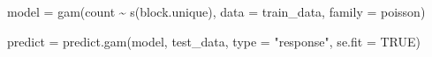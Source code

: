 \documentclass[
  letterpaper,
  DIV=11,
  numbers=noendperiod]{scrartcl}
\newenvironment{Shaded}{\begin{snugshade}}{\end{snugshade}}
\newcommand{\AttributeTok}[1]{\textcolor[rgb]{0.40,0.45,0.13}{#1}}
\newcommand{\ConstantTok}[1]{\textcolor[rgb]{0.56,0.35,0.01}{#1}}
\newcommand{\FunctionTok}[1]{\textcolor[rgb]{0.28,0.35,0.67}{#1}}
\newcommand{\NormalTok}[1]{\textcolor[rgb]{0.00,0.23,0.31}{#1}}
\newcommand{\OtherTok}[1]{\textcolor[rgb]{0.00,0.23,0.31}{#1}}
\newcommand{\SpecialCharTok}[1]{\textcolor[rgb]{0.37,0.37,0.37}{#1}}
\newcommand{\StringTok}[1]{\textcolor[rgb]{0.13,0.47,0.30}{#1}}
\begin{document}
\begin{Shaded}
\begin{Highlighting}[]
\NormalTok{model }\OtherTok{=} \FunctionTok{gam}\NormalTok{(count }\SpecialCharTok{\textasciitilde{}} \FunctionTok{s}\NormalTok{(block.unique), }\AttributeTok{data =}\NormalTok{ train\_data, }\AttributeTok{family =}\NormalTok{ poisson)}
\end{Highlighting}
\end{Shaded}

\begin{Shaded}
\begin{Highlighting}[]
\NormalTok{predict }\OtherTok{=} \FunctionTok{predict.gam}\NormalTok{(model, test\_data, }\AttributeTok{type =} \StringTok{"response"}\NormalTok{, }\AttributeTok{se.fit =} \ConstantTok{TRUE}\NormalTok{)}
\end{Highlighting}
\end{Shaded}
\end{document}
